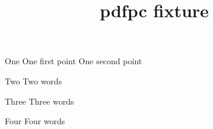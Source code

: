 \documentclass{beamer}
\title{pdfpc fixture}
\begin{document}
\begin{frame}{One}
  One first point \pause One second point
\end{frame}
\begin{frame}{Two}
  Two words
\end{frame}
\begin{frame}{Three}
  Three words
\end{frame}
\begin{frame}{Four}
  Four words
\end{frame}
\end{document}
